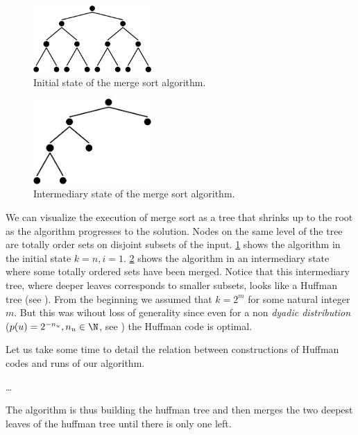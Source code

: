 \begin{figure}
	\centering
	\includegraphics[width=0.4\textwidth]{fig/merging/huffman-1-trim}
	\caption{Initial state of the merge sort algorithm.}
	\label{tree:merging:fig/huffman-1}
\end{figure}

\begin{figure}
	\centering
	\includegraphics[width=0.4\textwidth, bb= 0mm 0mm 131mm 74mm]{fig/merging/huffman-3-trim}
	\caption{Intermediary state of the merge sort algorithm.}
	\label{tree:merging:fig/huffman-3}
\end{figure}

We can visualize the execution of merge sort as a tree that shrinks up to the
root as the algorithm progresses to the solution. Nodes on the same level of
the tree are totally order sets on disjoint subsets of the input.
\ref{tree:merging:fig/huffman-1} shows the algorithm in the initial state $k =
n, i = 1$. \ref{tree:merging:fig/huffman-3} shows the algorithm in an
intermediary state where some totally ordered sets have been merged. Notice
that this intermediary tree, where deeper leaves corresponds to smaller
subsets, looks like a Huffman tree (see \cite{huffman1952method}). From the
beginning we assumed that $k = 2^m$ for some natural integer $m$. But this was
wihout loss of generality since even for a non \emph{dyadic distribution}
($p(u) = 2^{-n_u}, n_u \in \N$, see \cite{cover2012elements}) the Huffman code
is optimal.

Let us take some time to detail the relation between constructions of Huffman
codes and runs of our algorithm.

\dots

The algorithm is thus building the huffman tree and then merges the two deepest
leaves of the huffman tree until there is only one left.

